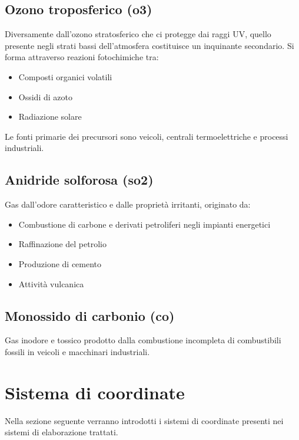 \subsection{Ozono troposferico (\acrshort{o3})}

Diversamente dall'ozono stratosferico che ci protegge dai raggi UV, quello presente negli strati bassi dell'atmosfera
costituisce un inquinante secondario. Si forma attraverso reazioni fotochimiche tra:

\begin{itemize}
  \item Composti organici volatili
  \item Ossidi di azoto
  \item Radiazione solare
\end{itemize}

Le fonti primarie dei precursori sono veicoli, centrali termoelettriche e processi industriali.

\subsection{Anidride solforosa (\acrshort{so2})}

Gas dall'odore caratteristico e dalle proprietà irritanti, originato da:

\begin{itemize}
  \item Combustione di carbone e derivati petroliferi negli impianti energetici
  \item Raffinazione del petrolio
  \item Produzione di cemento
  \item Attività vulcanica
\end{itemize}

\subsection{Monossido di carbonio (\acrshort{co})}

Gas inodore e tossico prodotto dalla combustione incompleta di combustibili fossili in veicoli e macchinari industriali.

\section{Sistema di coordinate}

Nella sezione seguente verranno introdotti i sistemi di coordinate presenti nei sistemi di elaborazione trattati.

